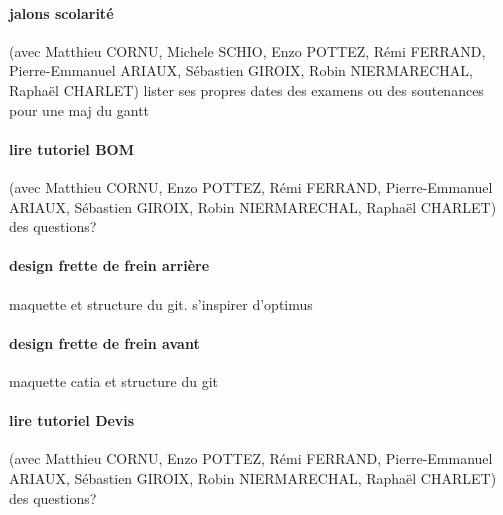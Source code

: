 \paragraph{jalons scolarité} (avec Matthieu CORNU, Michele SCHIO, Enzo POTTEZ, Rémi FERRAND, Pierre-Emmanuel ARIAUX, Sébastien GIROIX, Robin NIERMARECHAL, Raphaël CHARLET) lister ses propres dates des examens ou des soutenances pour une maj du gantt
\paragraph{lire tutoriel BOM} (avec Matthieu CORNU, Enzo POTTEZ, Rémi FERRAND, Pierre-Emmanuel ARIAUX, Sébastien GIROIX, Robin NIERMARECHAL, Raphaël CHARLET) des questions?
\paragraph{design frette de frein arrière} maquette et structure du git. s'inspirer d'optimus
\paragraph{design frette de frein avant} maquette catia et structure du git
\paragraph{lire tutoriel Devis} (avec Matthieu CORNU, Enzo POTTEZ, Rémi FERRAND, Pierre-Emmanuel ARIAUX, Sébastien GIROIX, Robin NIERMARECHAL, Raphaël CHARLET) des questions?

